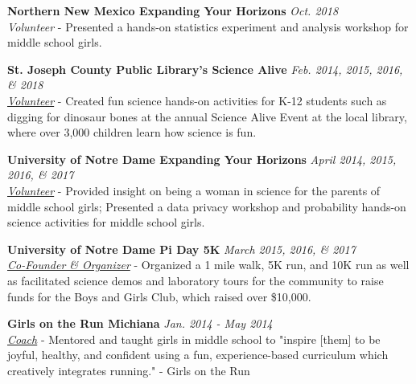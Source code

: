 \documentclass[11pt, letterpaper, roman]{moderncv} %
\newcommand{\outreachspace}{\vspace{5pt}}
\begin{document}
\outreachspace
\textbf{Northern New Mexico Expanding Your Horizons} \hfill \textit{Oct. 2018}\\
\textit{Volunteer} - Presented a hands-on statistics experiment and analysis workshop for middle school girls.

\outreachspace
\textbf{St. Joseph County Public Library's Science Alive} \hfill \textit{Feb. 2014, 2015, 2016, \& 2018}\\
\textit{\href{http://sjcpl.lib.in.us/sciencealive/}{Volunteer}} - Created fun science hands-on activities for K-12 students such as digging for dinosaur bones at the annual Science Alive Event at the local library, where over 3,000 children learn how science is fun.

\outreachspace
\textbf{University of Notre Dame Expanding Your Horizons} \hfill \textit{April 2014, 2015, 2016, \& 2017}\\
\textit{\href{http://www.expandingyourhorizons.org/conferences/NotreDame/}{Volunteer}} - Provided insight on being a woman in science for the parents of middle school girls; Presented a data privacy workshop and probability hands-on science activities for middle school girls. 

\outreachspace
\textbf{University of Notre Dame Pi Day 5K} \hfill \textit{March 2015, 2016, \& 2017}\\
\textit{\href{http://www.awis.nd.edu/piday5k}{Co-Founder \& Organizer}} - Organized a 1 mile walk, 5K run, and 10K run as well as facilitated science demos and laboratory tours for the community to raise funds for the Boys and Girls Club, which raised over \$10,000.


\outreachspace
\textbf{Girls on the Run Michiana} \hfill \textit{Jan. 2014 - May 2014}\\
\textit{\href{http://www.girlsontherunmichiana.org/}{Coach}} - Mentored and taught girls in middle school to "inspire [them] to be joyful, healthy, and confident using a fun, experience-based curriculum which creatively integrates running." - Girls on the Run
\end{document}
